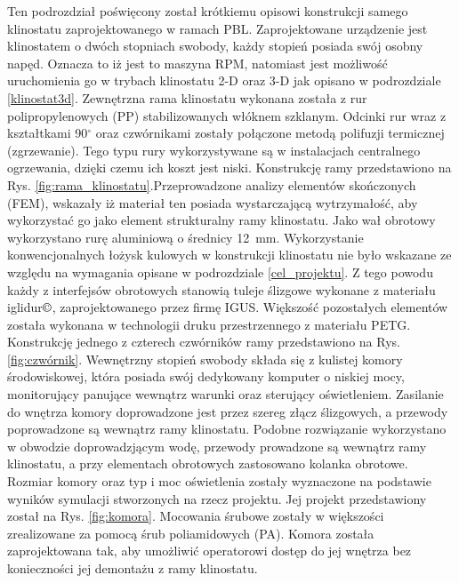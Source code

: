 Ten podrozdział poświęcony został krótkiemu opisowi konstrukcji samego klinostatu
zaprojektowanego w ramach PBL. Zaprojektowane urządzenie jest klinostatem o dwóch stopniach
swobody, każdy stopień posiada swój osobny napęd. Oznacza to iż jest to maszyna RPM, natomiast
jest możliwość uruchomienia go w trybach klinostatu 2-D oraz 3-D jak opisano w podrozdziale
\ref{klinostat3d}. Zewnętrzna rama klinostatu wykonana została z rur polipropylenowych (PP)
stabilizowanych włóknem szklanym. Odcinki rur wraz z kształtkami 90$^\circ$ oraz
czwórnikami zostały połączone metodą polifuzji termicznej (zgrzewanie). Tego typu rury
wykorzystywane są w instalacjach centralnego ogrzewania, dzięki czemu ich koszt jest
niski. Konstrukcję ramy przedstawiono na Rys. \ref{fig:rama_klinostatu}.Przeprowadzone
analizy elementów skończonych (FEM), wskazały iż materiał ten posiada wystarczającą
wytrzymałość, aby wykorzystać go jako element strukturalny ramy klinostatu. Jako wał
obrotowy wykorzystano rurę aluminiową o średnicy \SI{12}{mm}. Wykorzystanie
konwencjonalnych łożysk kulowych w konstrukcji klinostatu nie było wskazane ze
względu na wymagania opisane w podrozdziale \ref{cel_projektu}. Z tego powodu każdy
z interfejsów obrotowych stanowią tuleje ślizgowe wykonane z materiału
iglidur$\copyright$, zaprojektowanego przez firmę IGUS. Większość pozostałych
elementów została wykonana \linebreak w technologii druku przestrzennego z materiału PETG.
Konstrukcję jednego \linebreak z czterech czwórników ramy przedstawiono na Rys.
\ref{fig:czwórnik}. Wewnętrzny stopień swobody składa się z kulistej komory
środowiskowej, która posiada swój dedykowany komputer o niskiej mocy,
monitorujący panujące wewnątrz warunki oraz sterujący oświetleniem.
Zasilanie do wnętrza komory doprowadzone jest przez szereg złącz
ślizgowych, a przewody poprowadzone są wewnątrz ramy klinostatu. Podobne
rozwiązanie wykorzystano w obwodzie doprowadzjącym wodę, przewody
prowadzone są wewnątrz ramy klinostatu, a przy elementach obrotowych
zastosowano kolanka obrotowe. Rozmiar komory oraz typ i moc oświetlenia
zostały wyznaczone na podstawie wyników symulacji stworzonych na rzecz
projektu. Jej projekt przedstawiony został na Rys. \ref{fig:komora}.
Mocowania śrubowe zostały w większości zrealizowane za pomocą śrub
poliamidowych (PA). Komora została zaprojektowana tak, aby umożliwić operatorowi dostęp do jej
wnętrza bez konieczności jej demontażu \linebreak z ramy klinostatu.

